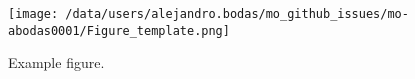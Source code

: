 \documentclass[gmd, manuscript]{copernicus}
\begin{document}





\begin{figure}[t]
\texttt{[image: /data/users/alejandro.bodas/mo\_github\_issues/mo-abodas0001/Figure\_template.png]}
\caption{Example figure.}
\end{figure}
%
%
%
%
%
%
%
%
%
%
%
%
%
%
%
%
%
%
%
\end{document}
